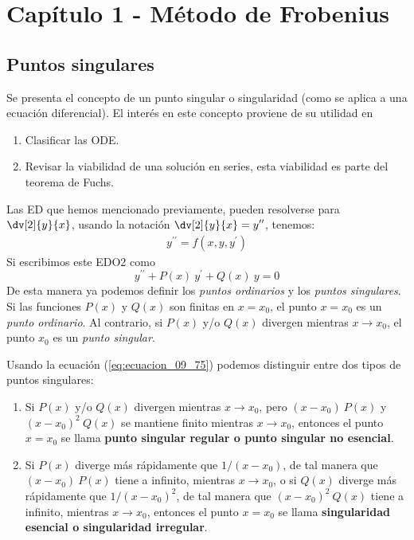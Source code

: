 \chapter{Capítulo 1 - Método de Frobenius}
\section{Puntos singulares}
Se presenta el concepto de un punto singular o singularidad (como se aplica a una ecuación diferencial). El interés en este concepto proviene de su utilidad en
\begin{enumerate}
\item Clasificar las ODE.
\item Revisar la viabilidad de una solución en series, esta viabilidad es parte del teorema de Fuchs.
\end{enumerate}
\par
Las ED que hemos mencionado previamente, pueden resolverse para $\displaystyle \dv[2]{y}{x}$, usando la notación $\displaystyle \dv[2]{y}{x} = y^{\prime \prime}$, tenemos:
\begin{align}
y^{\prime \prime} = f(x, y, y^{\prime})
\label{eq:ecuacion_09_74}
\end{align}
Si escribimos este EDO2 como
\begin{equation}
y^{\prime \prime} + P(x) \: y^{\prime} + Q(x) \: y = 0
\label{eq:ecuacion_09_75}
\end{equation}
De esta manera ya podemos definir los \emph{puntos ordinarios} y los \emph{puntos singulares}. Si las funciones $P(x)$ y $Q(x)$ son finitas en $x = x_{0}$, el punto $x = x_{0}$ es un \emph{punto ordinario}. Al 
contrario, si $P(x)$ y/o $Q(x)$ divergen mientras $x \to x_{0}$, el punto $x_{0}$ es un \emph{punto singular}.
\par
Usando la ecuación (\ref{eq:ecuacion_09_75}) podemos distinguir entre dos tipos de puntos singulares:
\begin{enumerate}
\item Si $P(x)$ y/o $Q(x)$ divergen mientras $x \to x_{0}$, pero $(x - x_{0}) \: P(x)$ y $(x - x_{0})^{2} \: Q(x)$ se mantiene finito mientras $x \to x_{0}$, entonces el punto $x = x_{0}$ se llama \textbf{punto singular regular o punto singular no esencial}.
\item Si $P(x)$ diverge más rápidamente que $1/(x - x_{0})$, de tal manera que $(x - x_{0}) \: P(x)$ tiene a infinito, mientras $x \to x_{0}$, o si $Q(x)$ diverge más rápidamente que $1/(x - x_{0})^{2}$, de tal manera que $(x - x_{0})^{2} \: Q(x)$ tiene a infinito, mientras $x \to x_{0}$, entonces el punto $x = x_{0}$ se llama \textbf{singularidad esencial o singularidad irregular}.
\end{enumerate}
